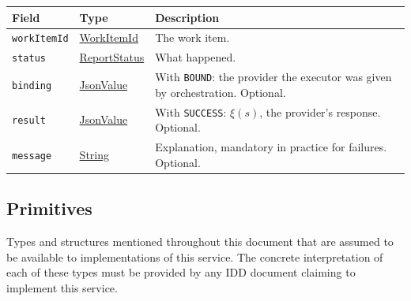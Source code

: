 \documentclass[a4paper]{arrowhead}
\newcommand{\mref}[1]{{\textcolor{ArrowheadPurple}{\hyperref[sec:model:#1]{#1}}}}
\newcommand{\pref}[1]{{\textcolor{ArrowheadGrey}{\hyperref[sec:model:primitives:#1]{#1}}}}
\begin{document}
{\small
\begin{longtable}{|p{3.9cm}|p{4.4cm}|p{7.5cm}|}

\hline
\rowcolor{gray!33} Field & Type & Description \\ \hline
\endhead
\texttt{workItemId} & \pref{WorkItemId} & The work item. \\ \hline
\texttt{status} & \mref{ReportStatus} & What happened. \\ \hline
\texttt{binding} & \pref{JsonValue} & With \texttt{BOUND}: the provider the executor was given by orchestration. Optional. \\ \hline
\texttt{result} & \pref{JsonValue} & With \texttt{SUCCESS}: $\xi(s)$, the provider's response. Optional. \\ \hline
\texttt{message} & \pref{String} & Explanation, mandatory in practice for failures. Optional. \\ \hline
\end{longtable}
}


\subsection{Primitives}
\label{sec:model:primitives}
Types and structures mentioned throughout this document that are assumed to be available to implementations of this
service. The concrete interpretation of each of these types must be provided by any IDD document claiming to implement
this service.
\end{document}
